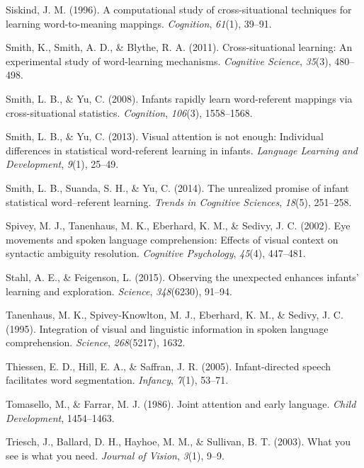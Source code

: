 \documentclass[oneside]{report}
\begin{document}
\hypertarget{ref-siskind1996computational}{}
Siskind, J. M. (1996). A computational study of cross-situational
techniques for learning word-to-meaning mappings. \emph{Cognition},
\emph{61}(1), 39--91.

\hypertarget{ref-smith2011cross}{}
Smith, K., Smith, A. D., \& Blythe, R. A. (2011). Cross-situational
learning: An experimental study of word-learning mechanisms.
\emph{Cognitive Science}, \emph{35}(3), 480--498.

\hypertarget{ref-smith2008infants}{}
Smith, L. B., \& Yu, C. (2008). Infants rapidly learn word-referent
mappings via cross-situational statistics. \emph{Cognition},
\emph{106}(3), 1558--1568.

\hypertarget{ref-smith2013visual}{}
Smith, L. B., \& Yu, C. (2013). Visual attention is not enough:
Individual differences in statistical word-referent learning in infants.
\emph{Language Learning and Development}, \emph{9}(1), 25--49.

\hypertarget{ref-smith2014unrealized}{}
Smith, L. B., Suanda, S. H., \& Yu, C. (2014). The unrealized promise of
infant statistical word--referent learning. \emph{Trends in Cognitive
Sciences}, \emph{18}(5), 251--258.

\hypertarget{ref-spivey2002eye}{}
Spivey, M. J., Tanenhaus, M. K., Eberhard, K. M., \& Sedivy, J. C.
(2002). Eye movements and spoken language comprehension: Effects of
visual context on syntactic ambiguity resolution. \emph{Cognitive
Psychology}, \emph{45}(4), 447--481.

\hypertarget{ref-stahl2015observing}{}
Stahl, A. E., \& Feigenson, L. (2015). Observing the unexpected enhances
infants' learning and exploration. \emph{Science}, \emph{348}(6230),
91--94.

\hypertarget{ref-tanenhaus1995integration}{}
Tanenhaus, M. K., Spivey-Knowlton, M. J., Eberhard, K. M., \& Sedivy, J.
C. (1995). Integration of visual and linguistic information in spoken
language comprehension. \emph{Science}, \emph{268}(5217), 1632.

\hypertarget{ref-thiessen2005infant}{}
Thiessen, E. D., Hill, E. A., \& Saffran, J. R. (2005). Infant-directed
speech facilitates word segmentation. \emph{Infancy}, \emph{7}(1),
53--71.

\hypertarget{ref-tomasello1986joint}{}
Tomasello, M., \& Farrar, M. J. (1986). Joint attention and early
language. \emph{Child Development}, 1454--1463.

\hypertarget{ref-triesch2003you}{}
Triesch, J., Ballard, D. H., Hayhoe, M. M., \& Sullivan, B. T. (2003).
What you see is what you need. \emph{Journal of Vision}, \emph{3}(1),
9--9.
\end{document}
